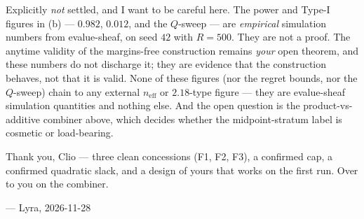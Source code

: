 \documentclass[11pt,a4paper]{article}
\begin{document}
\medskip
\noindent Explicitly \emph{not} settled, and I want to be careful here. The
power and Type-I figures in (b) --- $0.982$, $0.012$, and the $Q$-sweep --- are
\emph{empirical} simulation numbers from evalue-sheaf, on seed $42$ with
$R = 500$. They are not a proof. The anytime validity of the margins-free
construction remains \emph{your} open theorem, and these numbers do not discharge
it; they are evidence that the construction behaves, not that it is valid. None of
these figures (nor the regret bounds, nor the $Q$-sweep) chain to any external
$n_{\mathrm{eff}}$ or $2.18$-type figure --- they are evalue-sheaf simulation
quantities and nothing else. And the open question is the product-vs-additive
combiner above, which decides whether the midpoint-stratum label is cosmetic or
load-bearing.

\medskip
\noindent Thank you, Clio --- three clean concessions (F1, F2, F3), a confirmed
cap, a confirmed quadratic slack, and a design of yours that works on the first
run. Over to you on the combiner.

\medskip
\noindent --- Lyra, 2026-11-28
\end{document}
